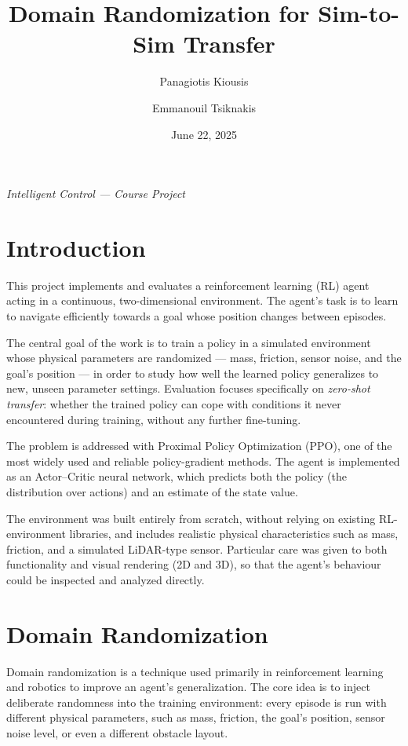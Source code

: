\documentclass[11pt]{article}
\title{\textbf{Domain Randomization for Sim-to-Sim Transfer}}
\author{Panagiotis Kiousis \and Emmanouil Tsiknakis}
\date{June 22, 2025}
\begin{document}
\maketitle

\begin{center}
\emph{Intelligent Control --- Course Project}
\end{center}

\tableofcontents
\newpage

\section{Introduction}

This project implements and evaluates a reinforcement learning (RL) agent acting in a continuous,
two-dimensional environment. The agent's task is to learn to navigate efficiently towards a goal whose
position changes between episodes.

The central goal of the work is to train a policy in a simulated environment whose physical parameters
are randomized --- mass, friction, sensor noise, and the goal's position --- in order to study how well
the learned policy generalizes to new, unseen parameter settings. Evaluation focuses specifically on
\emph{zero-shot transfer}: whether the trained policy can cope with conditions it never encountered
during training, without any further fine-tuning.

The problem is addressed with Proximal Policy Optimization (PPO), one of the most widely used and
reliable policy-gradient methods. The agent is implemented as an Actor--Critic neural network, which
predicts both the policy (the distribution over actions) and an estimate of the state value.

The environment was built entirely from scratch, without relying on existing RL-environment libraries,
and includes realistic physical characteristics such as mass, friction, and a simulated LiDAR-type
sensor. Particular care was given to both functionality and visual rendering (2D and 3D), so that the
agent's behaviour could be inspected and analyzed directly.

\section{Domain Randomization}

Domain randomization is a technique used primarily in reinforcement learning and robotics to improve an
agent's generalization. The core idea is to inject deliberate randomness into the training environment:
every episode is run with different physical parameters, such as mass, friction, the goal's position,
sensor noise level, or even a different obstacle layout.
\end{document}
